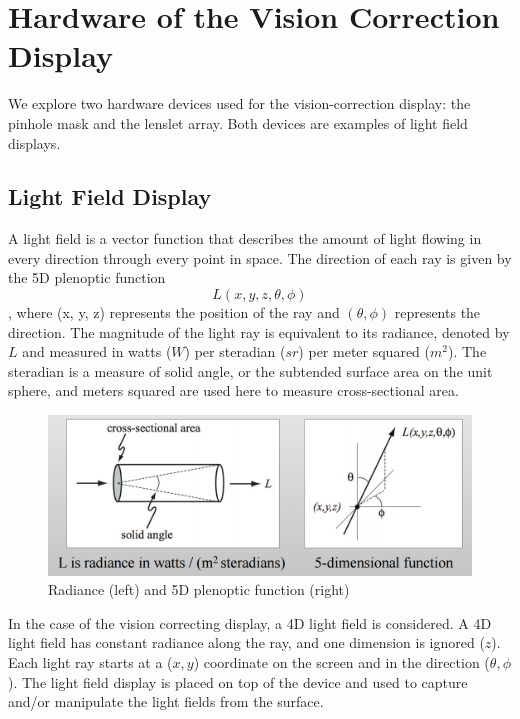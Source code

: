\chapter{Hardware of the Vision Correction Display}

We explore two hardware devices used for the vision-correction display: the pinhole mask and the lenslet array. Both devices are examples of light field displays.

\section{Light Field Display}
A light field is a vector function that describes the amount of light flowing in every direction through every point in space. The direction of each ray is given by the 5D plenoptic function $$L(x, y, z, \theta, \phi)$$, where (x, y, z) represents the position of the ray and $(\theta, \phi)$ represents the direction. The magnitude of the light ray is equivalent to its radiance, denoted by $L$ and measured in watts ($W$) per steradian ($sr$) per meter squared ($m^2$). The steradian is a measure of solid angle, or the subtended surface area on the unit sphere, and meters squared are used here to measure cross-sectional area.

\begin{figure}[ht]
  \centering
  \includegraphics[width=5in]{chapters/chapter3/images/light_field.png}
  \caption{Radiance (left) and 5D plenoptic function (right) \cite{Stanford}}
  \label{fig:plenoptic}
\end{figure}

In the case of the vision correcting display, a 4D light field is considered. A 4D light field has constant radiance along the ray, and one dimension is ignored ($z$). Each light ray starts at a ($x, y$) coordinate on the screen and in the direction ($\theta, \phi$). The light field display is placed on top of the device and used to capture and/or manipulate the light fields from the surface.


